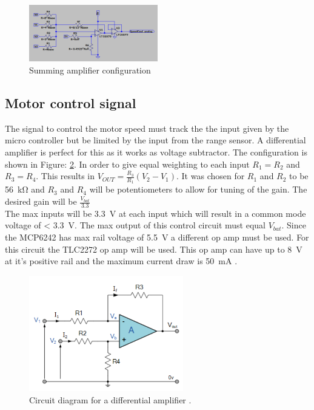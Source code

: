 \begin{figure}[H]
\centering
\includegraphics[width=0.5\textwidth]{./Figures/DAC_sim_cir.png}
\caption{Summing amplifier configuration}
\label{fig:DAC_sim_sumAmp}
\end{figure}

\clearpage
\subsection{Motor control signal}
The signal to control the motor speed must track the the input given by the micro controller but be limited by the input from the range sensor. A differential amplifier is perfect for this as it works as voltage subtractor. The configuration is shown in Figure: \ref{fig:mtrl_ctrl_dif}. 
In order to give equal weighting to each input $R_1 = R_2$ and $R_3 = R_4$. This results in $V_{OUT} = \frac{R_3}{R_1} (V_2-V_1)$. It was chosen for $R_1$ and $R_2$ to be \SI{56}{\kilo\ohm} and $R_3$ and $R_4$ will be potentiometers to allow for tuning of the gain. The desired gain will be $\frac{V_{bat}}{3.3}$\\

The max inputs will be \SI{3.3}{\volt} at each input which will result in a common mode voltage of < \SI{3.3}{\volt}. The max output of this control circuit must equal $V_{bat}$. Since the MCP6242 has max rail voltage of \SI{5.5}{\volt} a different op amp must be used. For this circuit the TLC2272 op amp will be used. This op amp can have up to \SI{8}{\volt} at it's positive rail and the maximum current draw is \SI{50}{\milli\ampere} \cite{TLC2272}.

\begin{figure}[H]
\centering
\includegraphics[width = 0.6\textwidth]{./Figures/Mtr_Ctrl_Dif.png}
\caption{Circuit diagram for a differential amplifier \cite{DifAmp}.}
\label{fig:mtrl_ctrl_dif}
\end{figure}

